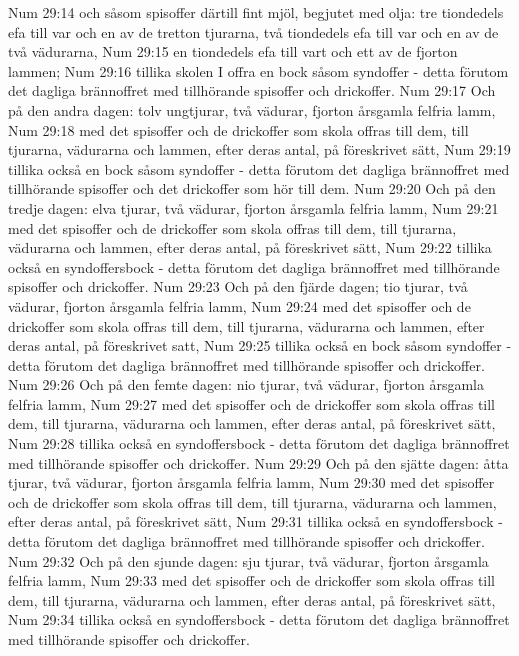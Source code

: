 Num 29:14  och såsom spisoffer därtill fint mjöl, begjutet med olja: tre tiondedels efa till var och en av de tretton tjurarna, två tiondedels efa till var och en av de två vädurarna,
Num 29:15  en tiondedels efa till vart och ett av de fjorton lammen;
Num 29:16  tillika skolen I offra en bock såsom syndoffer - detta förutom det dagliga brännoffret med tillhörande spisoffer och drickoffer.
Num 29:17  Och på den andra dagen: tolv ungtjurar, två vädurar, fjorton årsgamla felfria lamm,
Num 29:18  med det spisoffer och de drickoffer som skola offras till dem, till tjurarna, vädurarna och lammen, efter deras antal, på föreskrivet sätt,
Num 29:19  tillika också en bock såsom syndoffer - detta förutom det dagliga brännoffret med tillhörande spisoffer och det drickoffer som hör till dem.
Num 29:20  Och på den tredje dagen: elva tjurar, två vädurar, fjorton årsgamla felfria lamm,
Num 29:21  med det spisoffer och de drickoffer som skola offras till dem, till tjurarna, vädurarna och lammen, efter deras antal, på föreskrivet sätt,
Num 29:22  tillika också en syndoffersbock - detta förutom det dagliga brännoffret med tillhörande spisoffer och drickoffer.
Num 29:23  Och på den fjärde dagen; tio tjurar, två vädurar, fjorton årsgamla felfria lamm,
Num 29:24  med det spisoffer och de drickoffer som skola offras till dem, till tjurarna, vädurarna och lammen, efter deras antal, på föreskrivet satt,
Num 29:25  tillika också en bock såsom syndoffer - detta förutom det dagliga brännoffret med tillhörande spisoffer och drickoffer.
Num 29:26  Och på den femte dagen: nio tjurar, två vädurar, fjorton årsgamla felfria lamm,
Num 29:27  med det spisoffer och de drickoffer som skola offras till dem, till tjurarna, vädurarna och lammen, efter deras antal, på föreskrivet sätt,
Num 29:28  tillika också en syndoffersbock - detta förutom det dagliga brännoffret med tillhörande spisoffer och drickoffer.
Num 29:29  Och på den sjätte dagen: åtta tjurar, två vädurar, fjorton årsgamla felfria lamm,
Num 29:30  med det spisoffer och de drickoffer som skola offras till dem, till tjurarna, vädurarna och lammen, efter deras antal, på föreskrivet sätt,
Num 29:31  tillika också en syndoffersbock - detta förutom det dagliga brännoffret med tillhörande spisoffer och drickoffer.
Num 29:32  Och på den sjunde dagen: sju tjurar, två vädurar, fjorton årsgamla felfria lamm,
Num 29:33  med det spisoffer och de drickoffer som skola offras till dem, till tjurarna, vädurarna och lammen, efter deras antal, på föreskrivet sätt,
Num 29:34  tillika också en syndoffersbock - detta förutom det dagliga brännoffret med tillhörande spisoffer och drickoffer.

